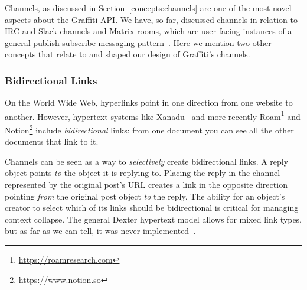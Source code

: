 Channels, as discussed in Section~\ref{concepts:channels}
are one of the most novel aspects about the Graffiti API.
We have, so far, discussed channels in relation to IRC and Slack channels
and Matrix rooms, which are user-facing instances of a general publish-subscribe
messaging pattern~\cite{pubsub}.
Here we mention two other concepts that relate to and shaped our
design of Graffiti's channels.








\subsubsection{Bidirectional Links}

On the World Wide Web, hyperlinks point in one direction from one website to another.
However, hypertext systems like Xanadu~\cite{xanadu}
and more recently Roam\footnote{\url{https://roamresearch.com}}
and Notion\footnote{\url{https://www.notion.so}}
include \emph{bidirectional} links:
from one document you can see all the other documents that link to it.

Channels can be seen as a way to \emph{selectively} create bidirectional links.
A reply object points \emph{to} the object it is replying to.
Placing the reply in the channel represented by the original post's URL
creates a link in the opposite direction
pointing \emph{from} the original post object \emph{to} the reply.
The ability for an object's creator to select which of its links should be bidirectional
is critical for managing context collapse.
The general Dexter hypertext model allows for mixed link types, but
as far as we can tell, it was never implemented~\cite{dexter}.


